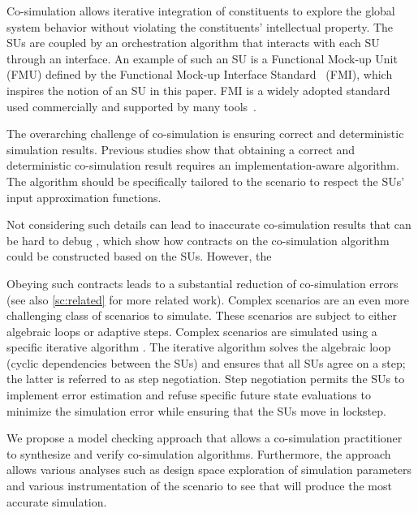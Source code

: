 Co-simulation allows iterative integration of constituents to explore the global system behavior without violating the constituents' intellectual property. 
The SUs are coupled by an orchestration algorithm that interacts with each SU through an interface.
An example of such an SU is a Functional Mock-up Unit (FMU) defined by the Functional Mock-up Interface Standard~\cite{FMI2014} (FMI), which inspires the notion of an SU in this paper. FMI is a widely adopted standard used commercially and supported by many tools~\cite{Tools_FMI}.

The overarching challenge of co-simulation is ensuring correct and deterministic simulation results. 
Previous studies \cite{Gomes2019,Oakes2021,Gomes2018f,Schweizer2015c} show that obtaining a correct and deterministic co-simulation result requires an implementation-aware algorithm.
The algorithm should be specifically tailored to the scenario to respect the SUs' input approximation functions.

Not considering such details can lead to inaccurate co-simulation results that can be hard to debug \cite{Gomes2019,Oakes2021}, which show how contracts on the co-simulation algorithm could be constructed based on the SUs. 
However, the 

Obeying such contracts leads to a substantial reduction of co-simulation errors (see also \cref{sc:related} for more related work). 
Complex scenarios are an even more challenging class of scenarios to simulate.
These scenarios are subject to either algebraic loops or adaptive steps. 
Complex scenarios are simulated using a specific iterative algorithm \cite{thrane2021}. 
The iterative algorithm solves the algebraic loop (cyclic dependencies between the SUs) and ensures that all SUs agree on a step; the latter is referred to as step negotiation. 
Step negotiation permits the SUs to implement error estimation and refuse specific future state evaluations to minimize the simulation error while ensuring that the SUs move in lockstep.


We propose a model checking approach that allows a co-simulation practitioner to synthesize and verify co-simulation algorithms.
Furthermore, the approach allows various analyses such as design space exploration of simulation parameters and various instrumentation of the scenario to see that will produce the most accurate simulation.


